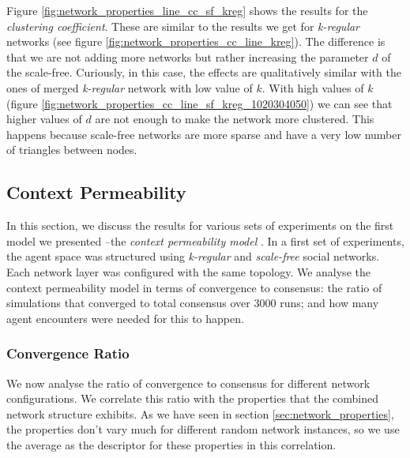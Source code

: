 \documentclass[preprint,number]{elsarticle}
\begin{document}
\noindent Figure \ref{fig:network_properties_line_cc_sf_kreg} shows the results for the \textit{clustering coefficient}. These are similar to the results we get for \textit{k-regular} networks (see figure \ref{fig:network_properties_cc_line_kreg}). The difference is that we are not adding more networks but rather increasing the parameter $d$ of the scale-free. Curiously, in this case, the effects are qualitatively similar with the ones of merged \textit{k-regular} network with low value of $k$. With high values of $k$ (figure \ref{fig:network_properties_cc_line_sf_kreg_1020304050}) we can see that higher values of $d$ are not enough to make the network more clustered. This happens because scale-free networks are more sparse and have a very low number of triangles between nodes.

\subsection{Context Permeability}
\label{sec:results:context_permeability}

\noindent In this section, we discuss the results for various sets of experiments on the first model we presented --the \textit{context permeability model} \cite{Antunes2007,Antunes2010}. In a first set of experiments, the agent space was structured using \textit{k-regular} and \textit{scale-free }social networks. Each network layer was configured with the same topology. We analyse the context permeability model in terms of convergence to consensus: the ratio of simulations that converged to total consensus over 3000 runs; and how many agent encounters were needed for this to happen. 

\subsubsection{Convergence Ratio}
\label{sec:ctx_perm_convergence}
\noindent We now analyse the ratio of convergence to consensus for different network configurations. We correlate this ratio with the properties that the combined network structure exhibits. As we have seen in section \ref{sec:network_properties}, the properties don't vary much for different random network instances, so we use the average as the descriptor for these properties in this correlation.
\end{document}
